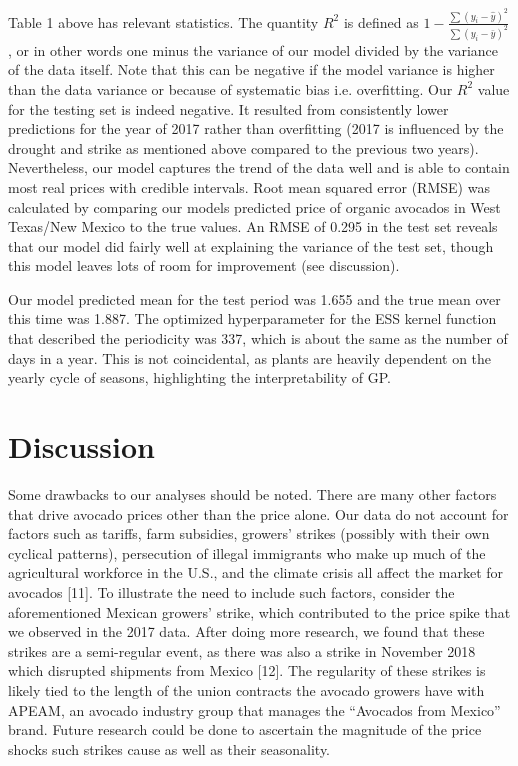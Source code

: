 \documentclass{article}
\begin{document}
Table 1 above has relevant statistics. The quantity $R^{2}$ is defined as $1 - \frac{\sum{(y_i - \hat{y})}^2}{\sum(y_i - \bar{y})^2}$, or in other words one minus the variance of our model divided by the variance of the data itself. Note that this can be negative if the model variance is higher than the data variance or because of systematic bias i.e. overfitting. Our $R^{2}$ value for the testing set is indeed negative. It resulted from consistently lower predictions for the year of 2017 rather than overfitting (2017 is influenced by the drought and strike as mentioned above compared to the previous two years). Nevertheless, our model captures the trend of the data well and is able to contain most real prices with credible intervals. Root mean squared error (RMSE) was calculated by comparing our models predicted price of organic avocados in West Texas/New Mexico to the true values. An RMSE of 0.295 in the test set reveals that our model did fairly well at explaining the variance of the test set, though this model leaves lots of room for improvement (see discussion). 

Our model predicted mean for the test period was 1.655 and the true mean over this time was 1.887. The optimized hyperparameter for the ESS kernel function that described the periodicity  was 337, which is about the same as the number of days in a year. This is not coincidental, as plants are heavily dependent on the yearly cycle of seasons, highlighting the interpretability of GP. 

\section{Discussion}
Some drawbacks to our analyses should be noted. There are many other factors that drive avocado prices other than the price alone. Our data do not account for factors such as tariffs, farm subsidies, growers’ strikes (possibly with their own cyclical patterns), persecution of illegal immigrants who make up much of the agricultural workforce in the U.S., and the climate crisis all affect the market for avocados [11]. To illustrate the need to include such factors, consider the aforementioned Mexican growers’ strike, which contributed to the price spike that we observed in the 2017 data. After doing more research, we found that these strikes are a semi-regular event, as there was also a strike in November 2018 which disrupted shipments from Mexico [12]. The regularity of these strikes is likely tied to the length of the union contracts the avocado growers have with APEAM, an avocado industry group that manages the “Avocados from Mexico” brand. Future research could be done to ascertain the magnitude of the price shocks such strikes cause as well as their seasonality. 
\end{document}
